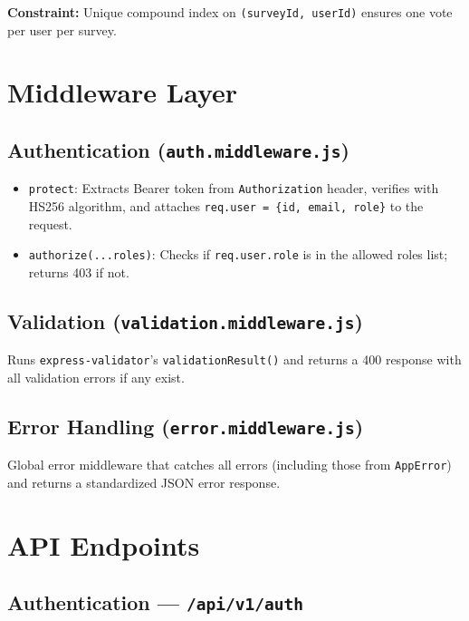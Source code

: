 \documentclass[12pt,a4paper]{article}
\begin{document}
\noindent\textbf{Constraint:} Unique compound index on \texttt{(surveyId, userId)} ensures one vote per user per survey.

\section{Middleware Layer}

\subsection{Authentication (\texttt{auth.middleware.js})}

\begin{itemize}
  \item \texttt{protect}: Extracts Bearer token from \texttt{Authorization} header, verifies with HS256 algorithm, and attaches \texttt{req.user = \{id, email, role\}} to the request.
  \item \texttt{authorize(...roles)}: Checks if \texttt{req.user.role} is in the allowed roles list; returns 403 if not.
\end{itemize}

\subsection{Validation (\texttt{validation.middleware.js})}
Runs \texttt{express-validator}'s \texttt{validationResult()} and returns a 400 response with all validation errors if any exist.

\subsection{Error Handling (\texttt{error.middleware.js})}
Global error middleware that catches all errors (including those from \texttt{AppError}) and returns a standardized JSON error response.

\section{API Endpoints}

\subsection{Authentication --- \texttt{/api/v1/auth}}
\end{document}
